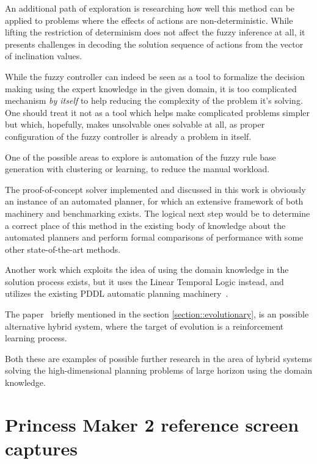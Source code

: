 \documentclass[12pt, a4paper]{report}
\begin{document}
	An additional path of exploration is researching how well this method can be applied to problems where the effects of actions are non-deterministic.
	While lifting the restriction of determinism does not affect the fuzzy inference at all, it presents challenges in decoding the solution sequence of actions from the vector of inclination values.
	
	While the fuzzy controller can indeed be seen as a tool to formalize the decision making using the expert knowledge in the given domain, it is too complicated mechanism \textit{by itself} to help reducing the complexity of the problem it's solving.
	One should treat it not as a tool which helps make complicated problems simpler but which, hopefully, makes unsolvable ones solvable at all, as proper configuration of the fuzzy controller is already a problem in itself.
	
	One of the possible areas to explore is automation of the fuzzy rule base generation with clustering or learning, to reduce the manual workload.

	The proof-of-concept solver implemented and discussed in this work is obviously an instance of an automated planner, for which an extensive framework of both machinery and benchmarking exists.
	The logical next step would be to determine a correct place of this method in the existing body of knowledge about the automated planners and perform formal comparisons of performance with some other state-of-the-art methods.

	Another work which exploits the idea of using the domain knowledge in the solution process exists, but it uses the Linear Temporal Logic instead, and utilizes the existing PDDL automatic planning machinery~\cite{LU2025121666}.

	The paper~\cite{song2023rl_ea} briefly mentioned in the section \ref{section::evolutionary}, is an possible alternative hybrid system, where the target of evolution is a reinforcement learning process.

	Both these are examples of possible further research in the area of hybrid systems solving the high-dimensional planning problems of large horizon using the domain knowledge.
	
	\printbibliography

	\appendix
	
	\chapter{Princess Maker 2 reference screen captures}
	\label{appendix::screenshots}
	
\end{document}

